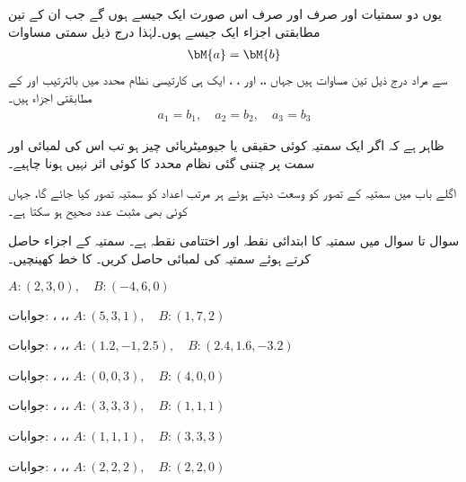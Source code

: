 یوں دو سمتیات  اور  صرف اور صرف اس صورت ایک جیسے ہوں گے جب ان کے تین مطابقتی اجزاء ایک جیسے ہوں۔لہٰذا درج ذیل سمتی مساوات
\begin{align*}
\bM{a}=\bM{b}
\end{align*}
سے مراد درج ذیل تین مساوات ہیں جہاں ،، اور ، ،  ایک ہی کارتیسی نظام محدد میں بالترتیب  اور  کے مطابقتی اجزاء ہیں۔
\begin{align*}
a_1=b_1,\quad a_2=b_2,\quad a_3=b_3
\end{align*}

ظاہر ہے کہ اگر ایک سمتیہ کوئی حقیقی یا جیومیٹریائی چیز ہو تب اس کی لمبائی اور سمت پر چننی گئی نظام محدد کا کوئی اثر نہیں ہونا چاہیے۔ 

اگلے باب میں سمتیہ کے تصور کو وسعت دیتے ہوئے ہر مرتب  اعداد کو سمتیہ تصور کیا جائے گا، جہاں   کوئی بھی مثبت عدد صحیح ہو سکتا ہے۔

سوال  تا سوال  میں سمتیہ  کا ابتدائی نقطہ  اور اختتامی نقطہ  ہے۔ سمتیہ  کے اجزاء حاصل کرتے ہوئے سمتیہ کی لمبائی  حاصل کریں۔ کا خط کھینچیں۔

\quad
$A:(2,3,0), \quad B:(-4,6,0)$

جوابات: ،  ،، 
\quad
$A:(5,3,1), \quad B:(1,7,2)$

جوابات: ،  ،، 
\quad
$A:(1.2,-1,2.5), \quad B:(2.4,1.6,-3.2)$

جوابات: ،  ،، 
\quad
$A:(0,0,3), \quad B:(4,0,0)$

جوابات: ،  ،، 
\quad
$A:(3,3,3), \quad B:(1,1,1)$

جوابات: ،  ،، 
\quad
$A:(1,1,1), \quad B:(3,3,3)$

جوابات: ،  ،، 
\quad
$A:(2,2,2), \quad B:(2,2,0)$


